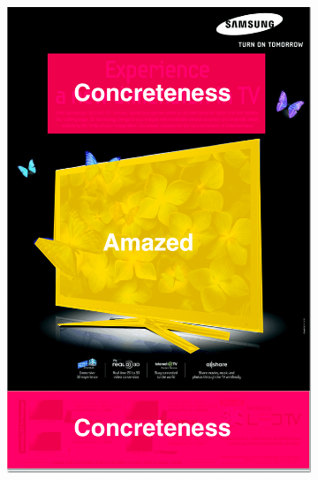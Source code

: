 \begin{figure}[!h]
\begin{subfigure}[b]{0.24\textwidth}
         \includegraphics[scale=0.22]{images/Image2_Segment.png}
     \end{subfigure}



\end{figure}
